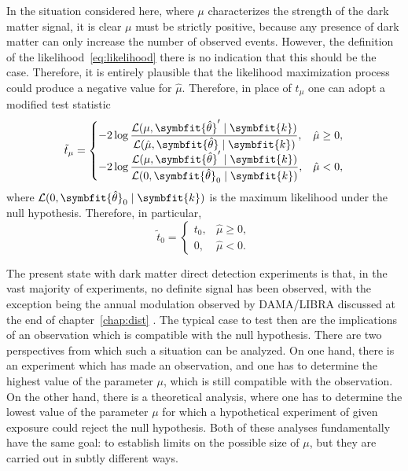 \documentclass[b5paper, 10pt, twoside]{book}
\renewcommand{\vec}[1]{\symbfit{#1}}
\newcommand{\unitv}[1]{\symbfit{\hat{#1}}}
\begin{document}
In the situation considered here, where $\mu$ characterizes the strength of the dark matter signal, it is clear $\mu$ must be strictly positive, because any presence of dark matter can only increase the number of observed events. However, the definition of the likelihood~\eqref{eq:likelihood} there is no indication that this should be the case. Therefore, it is entirely plausible that the likelihood maximization process could produce a negative value for $\hat{\mu}$. Therefore, in place of $t_\mu$ one can adopt a modified test statistic \parencite{BaxterEtAl2021}
\begin{equation}
\tilde{t}_\mu=
\begin{cases}
\displaystyle-2\log\frac{\mathcal{L}(\mu,\unitv{\theta}'\mid\vec{k})}{\mathcal{L}(\hat{\mu},\unitv{\theta}\mid\vec{k})},&\hat{\mu}\geq0,\\
\displaystyle-2\log\frac{\mathcal{L}(\mu,\unitv{\theta}'\mid\vec{k})}{\mathcal{L}(0,\unitv{\theta}_0\mid\vec{k})},&\hat{\mu}<0,
\end{cases}
\end{equation}
where $\mathcal{L}(0,\unitv{\theta}_0\mid\vec{k})$ is the maximum likelihood under the null hypothesis. Therefore, in particular,
\begin{equation}
\tilde{t}_0=
\begin{cases}
t_0,&\hat{\mu}\geq0,\\
0,&\hat{\mu}<0.
\end{cases}
\end{equation}

The present state with dark matter direct detection experiments is that, in the vast majority of experiments, no definite signal has been observed, with the exception being the annual modulation observed by DAMA/LIBRA discussed at the end of chapter~\ref{chap:dist} \parencite{BernabeiEtAl2023}. The typical case to test then are the implications of an observation which is compatible with the null hypothesis. There are two perspectives from which such a situation can be analyzed. On one hand, there is an experiment which has made an observation, and one has to determine the highest value of the parameter $\mu$, which is still compatible with the observation. On the other hand, there is a theoretical analysis, where one has to determine the lowest value of the parameter $\mu$ for which a hypothetical experiment of given exposure could reject the null hypothesis. Both of these analyses fundamentally have the same goal: to establish limits on the possible size of $\mu$, but they are carried out in subtly different ways.
\end{document}
